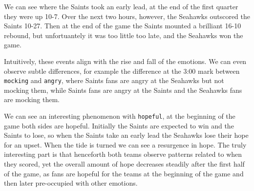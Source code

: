 \documentclass[11pt]{article}
\begin{document}
We can see where the Saints took an early lead, at the end of the first quarter they were up 10-7. Over the next two hours, however, the Seahawks outscored the Saints 10-27. Then at the end of the game the Saints mounted a brilliant 16-10 rebound, but unfortuantely it was too little too late, and the Seahawks won the game.

Intuitively, these events align with the rise and fall of the emotions. We can even observe subtle differences, for example the difference at the 3:00 mark between \verb|mocking| and \verb|angry|, where Saints fans are angry at the Seahawks but not mocking them, while Saints fans are angry at the Saints and the Seahawks fans are mocking them.

We can see an interesting phenomenon with \verb|hopeful|, at the beginning of the game both sides are hopeful. Initially the Saints are expected to win and the Saints to lose, so when the Saints take an early lead the Seahawks lose their hope for an upset. When the tide is turned we can see a resurgence in hope. The truly interesting part is that henceforth both teams observe patterns related to when they scored, yet the overall amount of hope decreases steadily after the first half of the game, as fans are hopeful for the teams at the beginning of the game and then later pre-occupied with other emotions.
\end{document}
